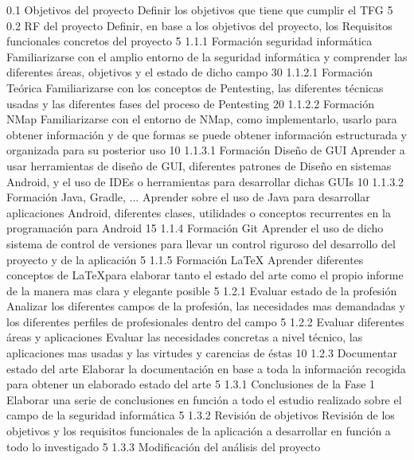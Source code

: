 \taskframe
	{0.1}
	{Objetivos del proyecto}
	{Definir los objetivos que tiene que cumplir el TFG}
	{5}
\taskframe
	{0.2}
	{RF del proyecto}
	{Definir, en base a los objetivos del proyecto, los Requisitos funcionales concretos del proyecto}
	{5}
\taskframe
	{1.1.1}
	{Formación seguridad informática}
	{Familiarizarse con el amplio entorno de la seguridad informática y comprender las diferentes áreas, objetivos y el estado de dicho campo}
	{30}
\taskframe
	{1.1.2.1}
	{Formación Teórica}
	{Familiarizarse con los conceptos de Pentesting, las diferentes técnicas usadas y las diferentes fases del proceso de Pentesting}
	{20}
\taskframe
	{1.1.2.2}
	{Formación NMap}
	{Familiarizarse con el entorno de NMap, como implementarlo, usarlo para obtener información y de que formas se puede obtener información estructurada y organizada para su posterior uso}
	{10}
\taskframe
	{1.1.3.1}
	{Formación Diseño de GUI}
	{Aprender a usar herramientas de diseño de GUI, diferentes patrones de Diseño en sistemas Android, y el uso de IDEs o herramientas para desarrollar dichas GUIs}
	{10}
\taskframe
	{1.1.3.2}
	{Formación Java, Gradle, ...}
	{Aprender sobre el uso de Java para desarrollar aplicaciones Android, diferentes clases, utilidades o conceptos recurrentes en la programación para Android}
	{15}
\taskframe
	{1.1.4}
	{Formación Git}
	{Aprender el uso de dicho sistema de control de versiones para llevar un control riguroso del desarrollo del proyecto y de la aplicación}
	{5}
\taskframe
	{1.1.5}
	{Formación \LaTeX}
	{Aprender diferentes conceptos de \LaTeX para elaborar tanto el estado del arte como el propio informe de la manera mas clara y elegante posible}
	{5}
\taskframe
	{1.2.1}
	{Evaluar estado de la profesión}
	{Analizar los diferentes campos de la profesión, las necesidades mas demandadas y los diferentes perfiles de profesionales dentro del campo}
	{5}
\taskframe
	{1.2.2}
	{Evaluar diferentes áreas y aplicaciones}
	{Evaluar las necesidades concretas a nivel técnico, las aplicaciones mas usadas y las virtudes y carencias de éstas}
	{10}
\taskframe
	{1.2.3}
	{Documentar estado del arte}
	{Elaborar la documentación en base a toda la información recogida para obtener un elaborado estado del arte}
	{5}
\taskframe
	{1.3.1}
	{Conclusiones de la Fase 1}
	{Elaborar una serie de conclusiones en función a todo el estudio realizado sobre el campo de la seguridad informática}
	{5}
\taskframe
	{1.3.2}
	{Revisión de objetivos}
	{Revisión de los objetivos y los requisitos funcionales de la aplicación a desarrollar en función a todo lo investigado}
	{5}
\taskframe
	{1.3.3}
	{Modificación del análisis del proyecto}
